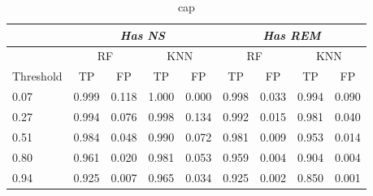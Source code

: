 \begin{table}[]
\centering
\begin{tabular}{l|cc|cc|cc|cc}
  & \multicolumn{4}{c|}{\textit{Has NS}} & \multicolumn{4}{c}{\textit{Has REM}} \\ \hline
  & \multicolumn{2}{c|}{RF} &  \multicolumn{2}{c|}{KNN} &  \multicolumn{2}{c|}{RF} &  \multicolumn{2}{c}{KNN} \\
  \hline
Threshold                      & TP   &  FP            & TP    & FP             & TP   &  FP          & TP  &   FP                       \\
\hline

0.07 & 0.999 & 0.118 & 1.000 & 0.000 & 0.998 & 0.033 & 0.994 & 0.090         \\
0.27 & 0.994 & 0.076 & 0.998 & 0.134 & 0.992 & 0.015 & 0.981 & 0.040         \\
0.51 & 0.984  & 0.048 & 0.990 & 0.072 & 0.981 & 0.009 & 0.953 & 0.014         \\
0.80 & 0.961 & 0.020 & 0.981 & 0.053 & 0.959 & 0.004 & 0.904 & 0.004         \\
0.94 & 0.925 & 0.007 & 0.965 & 0.034  & 0.925 & 0.002 & 0.850 & 0.001   \\
\hline     
\end{tabular}
\caption{cap}
\label{tab_fp_tp}
\end{table}

